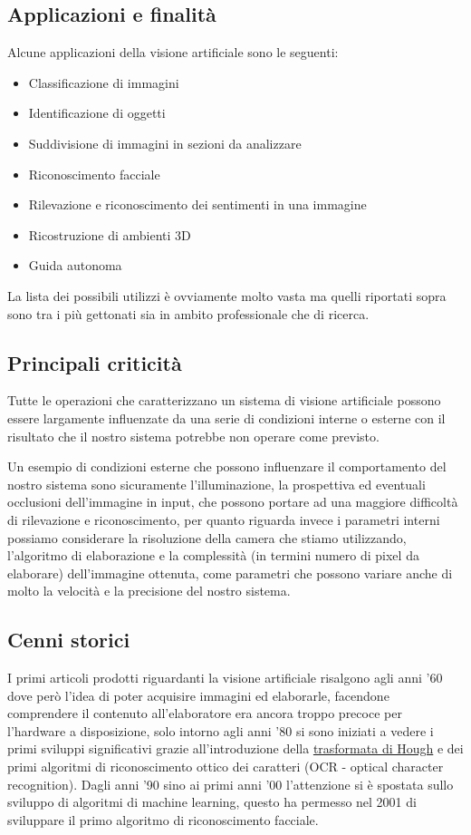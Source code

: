 \documentclass[12pt,a4paper,openright,twoside]{book}
\begin{document}
\subsection{Applicazioni e finalità}
Alcune applicazioni della visione artificiale sono le seguenti:
\begin{itemize}
	\item Classificazione di immagini
	\item Identificazione di oggetti
	\item Suddivisione di immagini in sezioni da analizzare
	\item Riconoscimento facciale
	\item Rilevazione e riconoscimento dei sentimenti in una immagine
	\item Ricostruzione di ambienti 3D
	\item Guida autonoma
\end{itemize}
La lista dei possibili utilizzi è ovviamente molto vasta ma quelli riportati sopra sono tra i più gettonati sia in ambito professionale che di ricerca.

\subsection{Principali criticità}
Tutte le operazioni che caratterizzano un sistema di visione artificiale possono essere largamente influenzate da una serie di condizioni interne o esterne con il risultato che il nostro sistema potrebbe non operare come previsto.

Un esempio di condizioni esterne che possono influenzare il comportamento del nostro sistema sono sicuramente l'illuminazione, la prospettiva ed eventuali occlusioni dell'immagine in input, che possono portare ad una maggiore difficoltà di rilevazione e riconoscimento, per quanto riguarda invece i parametri interni possiamo considerare la risoluzione della camera che stiamo utilizzando, l'algoritmo di elaborazione e la complessità (in termini numero di pixel da elaborare) dell'immagine ottenuta, come parametri che possono variare anche di molto la velocità e la precisione del nostro sistema.

\subsection{Cenni storici}
I primi articoli prodotti riguardanti la visione artificiale risalgono agli anni '60 dove però l'idea di poter acquisire immagini ed elaborarle, facendone comprendere il contenuto all'elaboratore era ancora troppo precoce per l'hardware a disposizione,
solo intorno agli anni '80 si sono iniziati a vedere i primi sviluppi significativi grazie all'introduzione della \href{https://en.wikipedia.org/wiki/Hough_transform}{trasformata di Hough}
e dei primi algoritmi di riconoscimento ottico dei caratteri (OCR - optical character recognition).
Dagli anni '90 sino ai primi anni '00 l'attenzione si è spostata sullo sviluppo di algoritmi di machine learning, questo ha permesso nel 2001 di sviluppare il primo algoritmo di riconoscimento facciale.\cite{artificialVisionHistory}
\end{document}
